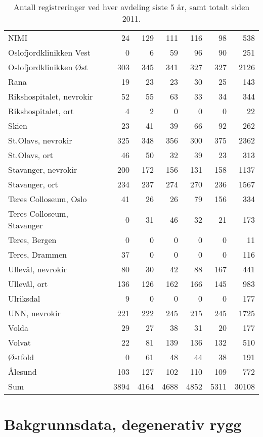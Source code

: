 \documentclass [norsk,a4paper,twoside]{article}\usepackage[]{graphicx}\usepackage[]{color}
\begin{document}
\begin{table}[ht]
\begin{tabular}{lrrrrrr}
  NIMI & 24 & 129 & 111 & 116 & 98 & 538 \\ 
  Oslofjordklinikken Vest & 0 & 6 & 59 & 96 & 90 & 251 \\ 
  Oslofjordklinikken Øst & 303 & 345 & 341 & 327 & 327 & 2126 \\ 
  Rana & 19 & 23 & 23 & 30 & 25 & 143 \\ 
  Rikshospitalet, nevrokir & 52 & 55 & 63 & 33 & 34 & 344 \\ 
  Rikshospitalet, ort & 4 & 2 & 0 & 0 & 0 & 22 \\ 
  Skien & 23 & 41 & 39 & 66 & 92 & 262 \\ 
  St.Olavs, nevrokir & 325 & 348 & 356 & 300 & 375 & 2362 \\ 
  St.Olavs, ort & 46 & 50 & 32 & 39 & 23 & 313 \\ 
  Stavanger, nevrokir & 200 & 172 & 156 & 131 & 158 & 1137 \\ 
  Stavanger, ort & 234 & 237 & 274 & 270 & 236 & 1567 \\ 
  Teres Colloseum, Oslo & 41 & 26 & 26 & 79 & 156 & 334 \\ 
  Teres Colloseum, Stavanger & 0 & 31 & 46 & 32 & 21 & 173 \\ 
  Teres, Bergen & 0 & 0 & 0 & 0 & 0 & 11 \\ 
  Teres, Drammen & 37 & 0 & 0 & 0 & 0 & 116 \\ 
  Ullevål, nevrokir & 80 & 30 & 42 & 88 & 167 & 441 \\ 
  Ullevål, ort & 136 & 126 & 162 & 166 & 145 & 983 \\ 
  Ulriksdal & 9 & 0 & 0 & 0 & 0 & 177 \\ 
  UNN, nevrokir & 221 & 222 & 245 & 215 & 245 & 1725 \\ 
  Volda & 29 & 27 & 38 & 31 & 20 & 177 \\ 
  Volvat & 22 & 81 & 139 & 136 & 132 & 510 \\ 
  Østfold & 0 & 61 & 48 & 44 & 38 & 191 \\ 
  Ålesund & 103 & 127 & 102 & 110 & 109 & 772 \\ 
  Sum & 3894 & 4164 & 4688 & 4852 & 5311 & 30108 \\ 
   \hline
\end{tabular}
\caption{Antall registreringer ved hver avdeling siste 5 år, samt totalt siden 2011.} 
\label{tab:AntReg}
\end{table}


\clearpage



\section{Bakgrunnsdata, degenerativ rygg}
\end{document}
